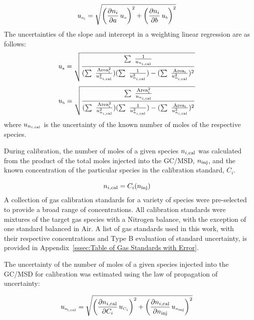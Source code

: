 \documentclass[12pt]{article}
\begin{document}
\begin{equation}
\label{eq:Given_Moles_Uncertainty}
 u_{\rm \scriptscriptstyle n_{i}} = \sqrt{{\left( \frac{\partial n_{i}}{\partial a}\,u_{\scriptscriptstyle a} \right)}^2+{\left(\frac{\partial {n_{i}}}{\partial b}\,u_{\scriptscriptstyle b}\right)}^2}
\end{equation}
The uncertainties of the slope and intercept in a weighting linear regression are as follows:
\begin{equation}
\label{eq:Slope_Uncertainty}
u_{\rm \scriptscriptstyle a} =\sqrt{\frac{\sum~\frac{1}{u_{n_{i,\rm cal}}}}{(\sum~\frac{\rm{Area}_{i}^2}{{u_{n_{i,\rm cal}}^2}})(\sum~\frac{1}{{u_{n_{i,\rm cal}}^2}})-(\sum~\frac{\rm{Area}_{i}}{{u_{n_{i,\rm cal}}^2}})^2}}
\end{equation}
\begin{equation}
\label{eq:Intercept_Uncertainty}
u_{\rm \scriptscriptstyle b} =\sqrt{\frac{\sum~\frac{\rm{Area}_{i}^2}{u_{n_{i,\rm cal}}}}{(\sum~\frac{\rm{Area}_{i}^2}{{u_{n_{i,\rm cal}}^2}})(\sum~\frac{1}{{u_{n_{i,\rm cal}}^2}})-(\sum~\frac{\rm{Area}_{i}}{{u_{n_{i,\rm cal}}^2}})^2}}
\end{equation}
where $u_{n_{i,\rm cal}}$ is the uncertainty of the known number of moles of the respective species.

During calibration, the number of moles of a given species $n_{i,\rm cal}$ was calculated from the product of the total moles injected into the GC/MSD, $n_{\rm inj}$, and the known concentration of the particular species in the calibration standard, $C_{i}$.

\begin{equation}
\label{eq:Cal_Moles}
n_{i,\rm cal} = C_{i}(n_{\rm inj})
\end{equation}
A collection of gas calibration standards for a variety of species were pre-selected to provide a broad range of concentrations. All calibration standards were mixtures of the target gas species with a Nitrogen balance, with the exception of one standard balanced in Air. A list of gas standards used in this work, with their respective concentrations and Type B evaluation of standard uncertainty, is provided in Appendix~\ref{sssec:Table of Gas Standards with Error}.

The uncertainty of the number of moles of a given species injected into the GC/MSD for calibration was estimated using the law of propagation of uncertainty:

\begin{equation}
\label{eq:Given_Moles_Cal_Uncertainty}
 u_{\rm \scriptscriptstyle n_{i,\rm cal}} = \sqrt{{\left( \frac{\partial n_{i,\rm cal}}{\partial C_{i}}\,u_{\scriptscriptstyle C_{i}} \right)}^2+{\left(\frac{\partial n_{i,\rm cal}}{\partial n_{\rm inj}}\,u_{\scriptscriptstyle n_{\rm inj}}\right)}^2}
\end{equation}
\end{document}
